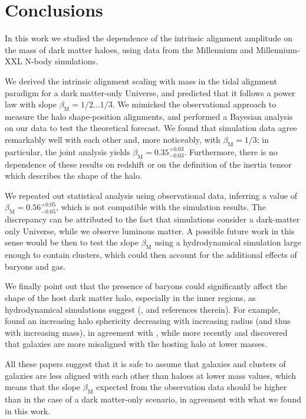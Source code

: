 \documentclass[a4paper,fleqn,usenatbib]{mnras}
\begin{document}
\section{Conclusions}
In this work we studied the dependence of the intrinsic alignment amplitude on the mass of dark matter haloes, using data from the Millennium and Millennium-XXL N-body simulations.

We derived the intrinsic alignment scaling with mass in the tidal alignment paradigm for a dark matter-only Universe, and predicted that it follows a power law with slope $\beta_{\mathrm{M}} = 1/2\ldots 1/3$. We mimicked the observational approach to measure the halo shape-position alignments, and performed a Bayesian analysis on our data to test the theoretical forecast. We found that simulation data agree remarkably well with each other and, more noticeably, with $\beta_{\mathrm{M}} = 1/3$; in particular, the joint analysis yields $\beta_{\mathrm{M}} = 0.35^{+0.03}_{-0.03}$. Furthermore, there is no dependence of these results on redshift or on the definition of the inertia tensor which describes the shape of the halo. 

We repeated out statistical analysis using observational data, inferring a value of $\beta_{\mathrm{M}} = 0.56^{+0.05}_{-0.05}$, which is not compatible with the simulation results. The discrepancy can be attributed to the fact that simulations consider a dark-matter only Universe, while we observe luminous matter. A possible future work in this sense would be then to test the slope $\beta_{\mathrm{M}}$ using a hydrodynamical simulation large enough to contain clusters, which could then account for the additional effects of baryons and gas.

We finally point out that the presence of baryons could significantly affect the shape of the host dark matter halo, especially in the inner regions, as hydrodynamical simulations suggest (\citealt{Kiesslingetal2015}, and references therein). For example, \citet{Bailinetal2005} found an increasing halo sphericity decreasing with increasing radius (and thus with increasing mass), in agreement with \citet{Kazantzidisetal2004}, while more recently \citet{Tennetietal2014} and \citet{Velliscigetal2015a} discovered that galaxies are more misaligned with the hosting halo at lower masses.

All these papers suggest that it is safe to assume that galaxies and clusters of galaxies are less aligned with each other than haloes at lower mass values, which means that the slope $\beta_{\mathrm{M}}$ expected from the observation data should be higher than in the case of a dark matter-only scenario, in agreement with what we found in this work.
\end{document}
